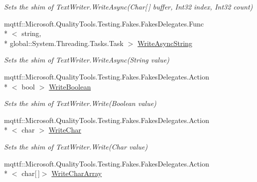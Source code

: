 \begin{DoxyCompactItemize}
\begin{DoxyCompactList}\small\item\em Sets the shim of Text\-Writer.\-Write\-Async(\-Char\mbox{[}$\,$\mbox{]} buffer, Int32 index, Int32 count)\end{DoxyCompactList}\item 
mqttf\-::\-Microsoft.\-Quality\-Tools.\-Testing.\-Fakes.\-Fakes\-Delegates.\-Func\\*
$<$ string, \\*
global\-::\-System.\-Threading.\-Tasks.\-Task $>$ \hyperlink{class_system_1_1_i_o_1_1_fakes_1_1_shim_text_writer_a0ff8dfed6093d426da57dc0c6fe72af9}{Write\-Async\-String}
\begin{DoxyCompactList}\small\item\em Sets the shim of Text\-Writer.\-Write\-Async(\-String value)\end{DoxyCompactList}\item 
mqttf\-::\-Microsoft.\-Quality\-Tools.\-Testing.\-Fakes.\-Fakes\-Delegates.\-Action\\*
$<$ bool $>$ \hyperlink{class_system_1_1_i_o_1_1_fakes_1_1_shim_text_writer_a9ee455a7b3bf88e3e6c828d57eeb3d9f}{Write\-Boolean}
\begin{DoxyCompactList}\small\item\em Sets the shim of Text\-Writer.\-Write(\-Boolean value)\end{DoxyCompactList}\item 
mqttf\-::\-Microsoft.\-Quality\-Tools.\-Testing.\-Fakes.\-Fakes\-Delegates.\-Action\\*
$<$ char $>$ \hyperlink{class_system_1_1_i_o_1_1_fakes_1_1_shim_text_writer_acf1707abc1848d8a4149cc77401931a7}{Write\-Char}
\begin{DoxyCompactList}\small\item\em Sets the shim of Text\-Writer.\-Write(\-Char value)\end{DoxyCompactList}\item 
mqttf\-::\-Microsoft.\-Quality\-Tools.\-Testing.\-Fakes.\-Fakes\-Delegates.\-Action\\*
$<$ char\mbox{[}$\,$\mbox{]}$>$ \hyperlink{class_system_1_1_i_o_1_1_fakes_1_1_shim_text_writer_a84067851e837c06cc90392f4e7ede5e6}{Write\-Char\-Array}

\end{DoxyCompactItemize}
